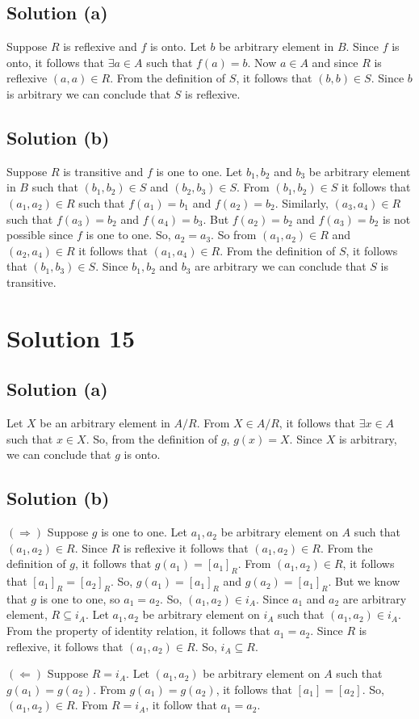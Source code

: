 \documentclass{article}
\begin{document}
\subsection{Solution (a)}
Suppose $R$ is reflexive and $f$ is onto. Let $b$ be arbitrary element
in $B$. Since $f$ is onto, it follows that $\exists a \in A$ such that
$f(a) = b$. Now $a \in A$ and since $R$ is reflexive $(a,a) \in R$.
From the definition of $S$, it follows that $(b,b) \in S$. Since $b$
is arbitrary we can conclude that $S$ is reflexive.

\subsection{Solution (b)}
Suppose $R$ is transitive and $f$ is one to one. Let $b_1, b_2$ and
$b_3$ be arbitrary element in $B$ such that $(b_1, b_2) \in S$ and
$(b_2, b_3) \in S$. From $(b_1, b_2) \in S$ it follows that $(a_1,
a_2) \in R$ such that $f(a_1) = b_1$ and $f(a_2) = b_2$. Similarly,
$(a_3,a_4) \in R$ such that $f(a_3) = b_2$ and $f(a_4) = b_3$. But
$f(a_2) = b_2$ and $f(a_3) = b_2$ is not possible since $f$ is one to
one. So, $a_2 = a_3$. So from $(a_1, a_2) \in R$ and $(a_2, a_4) \in
R$ it follows that $(a_1, a_4) \in R$. From the definition of $S$, it
follows that $(b_1, b_3) \in S$. Since $b_1, b_2$ and $b_3$ are
arbitrary we can conclude that $S$ is transitive.

\section{Solution 15}
\subsection{Solution (a)}Let $X$ be an arbitrary element in $A/R$.
From $X \in A / R$, it follows that $\exists x \in A$ such that $x \in
X$. So, from the definition of $g$, $g(x) = X$. Since $X$ is
arbitrary, we can conclude that $g$ is onto.

\subsection{Solution (b)}
$(\Rightarrow)$ Suppose $g$ is one to one. Let $a_1, a_2$ be arbitrary
element on $A$ such that $(a_1, a_2) \in R$. Since $R$ is reflexive it
follows that $(a_1, a_2) \in R$. From the definition of $g$, it
follows that $g(a_1) = [a_1]_R$. From $(a_1, a_2) \in R$, it follows
that $[a_1]_R = [a_2]_R$. So, $g(a_1) = [a_1]_R$ and $g(a_2) =
[a_1]_R$. But we know that $g$ is one to one, so $a_1 = a_2$. So,
$(a_1, a_2) \in i_A$. Since $a_1$ and $a_2$ are arbitrary element, $R
\subseteq i_A$. Let $a_1, a_2$ be arbitrary element on $i_A$ such that
$(a_1, a_2) \in i_A$. From the property of identity relation, it
follows that $a_1 = a_2$. Since $R$ is reflexive, it follows that
$(a_1, a_2) \in R$. So, $i_A \subseteq R$.

$(\Leftarrow)$ Suppose $R = i_A$. Let $(a_1, a_2)$ be arbitrary
element on $A$ such that $g(a_1) = g(a_2)$. From $g(a_1) = g(a_2)$, it
follows that $[a_1] = [a_2]$. So, $(a_1, a_2) \in R$. From $R = i_A$,
it follow that $a_1 = a_2$.
\end{document}
